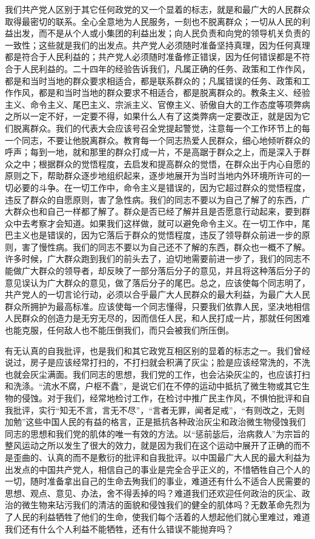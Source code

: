 我们共产党人区别于其它任何政党的又一个显着的标志，就是和最广大的人民群众取得最密切的联系。全心全意地为人民服务，一刻也不脱离群众；一切从人民的利益出发，而不是从个人或小集团的利益出发；向人民负责和向党的领导机关负责的一致性；这些就是我们的出发点。共产党人必须随时准备坚持真理，因为任何真理都是符合于人民利益的；共产党人必须随时准备修正错误，因为任何错误都是不符合于人民利益的。二十四年的经验告诉我们，凡属正确的任务、政策和工作作风，都是和当时当地的群众要求相适合，都是联系群众的；凡属错误的任务、政策和工作作风，都是和当时当地的群众要求不相适合，都是脱离群众的。教条主义、经验主义、命令主义、尾巴主义、宗派主义、官僚主义、骄傲自大的工作态度等项弊病之所以一定不好，一定要不得，如果什么人有了这类弊病一定要改正，就是因为它们脱离群众。我们的代表大会应该号召全党提起警觉，注意每一个工作环节上的每一个同志，不要让他脱离群众。教育每一个同志热爱人民群众，细心地倾听群众的呼声；每到一地，就和那里的群众打成一片，不是高踞于群众之上，而是深入于群众之中；根据群众的觉悟程度，去启发和提高群众的觉悟，在群众出于内心自愿的原则之下，帮助群众逐步地组织起来，逐步地展开为当时当地内外环境所许可的一切必要的斗争。在一切工作中，命令主义是错误的，因为它超过群众的觉悟程度，违反了群众的自愿原则，害了急性病。我们的同志不要以为自己了解了的东西，广大群众也和自己一样都了解了。群众是否已经了解并且是否愿意行动起来，要到群众中去考察才会知道。如果我们这样做，就可以避免命令主义。在一切工作中，尾巴主义也是错误的，因为它落后于群众的觉悟程度，违反了领导群众前进一步的原则，害了慢性病。我们的同志不要以为自己还不了解的东西，群众也一概不了解。许多时候，广大群众跑到我们的前头去了，迫切地需要前进一步了，我们的同志不能做广大群众的领导者，却反映了一部分落后分子的意见，并且将这种落后分子的意见误认为广大群众的意见，做了落后分子的尾巴。总之，应该使每个同志明了，共产党人的一切言论行动，必须以合乎最广大人民群众的最大利益，为最广大人民群众所拥护为最高标准。应该使每一个同志懂得，只要我们依靠人民，坚决地相信人民群众的创造力是无穷无尽的，因而信任人民，和人民打成一片，那就任何困难也能克服，任何敌人也不能压倒我们，而只会被我们所压倒。

有无认真的自我批评，也是我们和其它政党互相区别的显着的标志之一。我们曾经说过，房子是应该经常打扫的，不打扫就会积满了灰尘；脸是应该经常洗的，不洗也就会灰尘满面。我们同志的思想，我们党的工作，也会沾染灰尘的，也应该打扫和洗涤。“流水不腐，户枢不蠹”，是说它们在不停的运动中抵抗了微生物或其它生物的侵蚀。对于我们，经常地检讨工作，在检讨中推广民主作风，不惧怕批评和自我批评，实行“知无不言，言无不尽”，“言者无罪，闻者足戒”，“有则改之，无则加勉”这些中国人民的有益的格言，正是抵抗各种政治灰尘和政治微生物侵蚀我们同志的思想和我们党的肌体的唯一有效的方法。以“惩前毖后，治病救人”为宗旨的整风运动之所以发生了很大的效力，就是因为我们在这个运动中展开了正确的而不是歪曲的、认真的而不是敷衍的批评和自我批评。以中国最广大人民的最大利益为出发点的中国共产党人，相信自己的事业是完全合乎正义的，不惜牺牲自己个人的一切，随时准备拿出自己的生命去殉我们的事业，难道还有什么不适合人民需要的思想、观点、意见、办法，舍不得丢掉的吗？难道我们还欢迎任何政治的灰尘、政治的微生物来玷污我们的清洁的面貌和侵蚀我们的健全的肌体吗？无数革命先烈为了人民的利益牺牲了他们的生命，使我们每个活着的人想起他们就心里难过，难道我们还有什么个人利益不能牺牲，还有什么错误不能抛弃吗？

